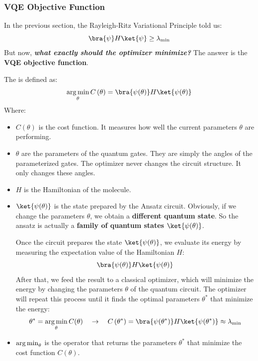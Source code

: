 \subsubsection{VQE Objective Function}\label{sec:vqe-objective-function}

In the previous section, the Rayleigh-Ritz Variational Principle told us:
\begin{equation*}
    \bra{\psi} H \ket{\psi} \geq \lambda_{\min}
\end{equation*}
But now, \emph{\textbf{what exactly should the optimizer minimize?}} The answer is the \textbf{VQE objective function}.

\highspace
The  is defined as:
\begin{equation}
    \argmin_{\theta} C\left(\theta\right) = \bra{\psi(\theta)} H \ket{\psi(\theta)}
\end{equation}
Where:
\begin{itemize}
    \item $C(\theta)$ is the cost function. It measures how well the current parameters $\theta$ are performing.
    \item $\theta$ are the parameters of the quantum gates. They are simply the angles of the parameterized gates. The optimizer never changes the circuit structure. It only changes these angles.
    \item $H$ is the Hamiltonian of the molecule.
    \item $\ket{\psi(\theta)}$ is the state prepared by the Ansatz circuit. Obviously, if we change the parameters $\theta$, we obtain a \textbf{different quantum state}. So the ansatz is actually a \textbf{family of quantum states} $\ket{\psi(\theta)}$.

    Once the circuit prepares the state $\ket{\psi(\theta)}$, we evaluate its energy by measuring the expectation value of the Hamiltonian $H$:
    \begin{equation*}
        \bra{\psi(\theta)} H \ket{\psi(\theta)}
    \end{equation*}
    After that, we feed the result to a classical optimizer, which will minimize the energy by changing the parameters $\theta$ of the quantum circuit. The optimizer will repeat this process until it finds the optimal parameters $\theta^*$ that minimize the energy:
    \begin{equation*}
        \theta^* = \argmin_{\theta} C(\theta) \quad \to \quad C\left(\theta^*\right) = \bra{\psi(\theta^*)} H \ket{\psi(\theta^*)} \approx \lambda_{\min} 
    \end{equation*}

    \item $\operatorname*{arg\,min}_{\theta}$ is the operator that returns the parameters $\theta^*$ that minimize the cost function $C(\theta)$.
\end{itemize}

